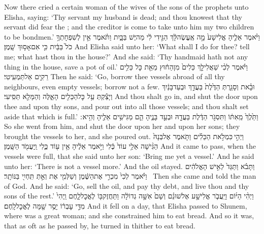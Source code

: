 {Now there cried a certain woman of the wives of the sons of the prophets unto Elisha, saying: ‘Thy servant my husband is dead; and thou knowest that thy servant did fear the \lord; and the creditor is come to take unto him my two children to be bondmen.’}
{וַיֹּ֨אמֶר אֵלֶ֤יהָ אֱלִישָׁע֙ מָ֣ה אֶֽעֱשֶׂה\maqqaf לָּ֔ךְ הַגִּ֣ידִי לִ֔י מַה\maqqaf יֶּשׁ\maqqaf {} בַּבָּ֑יִת וַתֹּ֗אמֶר אֵ֣ין לְשִׁפְחָתְךָ֥ כֹל֙ בַּבַּ֔יִת כִּ֖י אִם\maqqaf אָס֥וּךְ שָֽׁמֶן׃}
{And Elisha said unto her: ‘What shall I do for thee? tell me; what hast thou in the house?’ And she said: ‘Thy handmaid hath not any thing in the house, save a pot of oil.’}
{וַיֹּ֗אמֶר לְכִ֨י שַׁאֲלִי\maqqaf לָ֤ךְ כֵּלִים֙ מִן\maqqaf הַח֔וּץ מֵאֵ֖ת כׇּל\maqqaf {} כֵּלִ֥ים רֵקִ֖ים אַל\maqqaf תַּמְעִֽיטִי׃}
{Then he said: ‘Go, borrow thee vessels abroad of all thy neighbours, even empty vessels; borrow not a few.}
{וּבָ֗את וְסָגַ֤רְתְּ הַדֶּ֙לֶת֙ בַּעֲדֵ֣ךְ וּבְעַד\maqqaf בָּנַ֔יִךְ וְיָצַ֕קְתְּ עַ֥ל כׇּל\maqqaf הַכֵּלִ֖ים הָאֵ֑לֶּה וְהַמָּלֵ֖א תַּסִּֽיעִי׃}
{And thou shalt go in, and shut the door upon thee and upon thy sons, and pour out into all those vessels; and thou shalt set aside that which is full.’}
{וַתֵּ֙לֶךְ֙ מֵֽאִתּ֔וֹ וַתִּסְגֹּ֣ר הַדֶּ֔לֶת בַּעֲדָ֖הּ וּבְעַ֣ד בָּנֶ֑יהָ הֵ֛ם מַגִּישִׁ֥ים אֵלֶ֖יהָ וְהִ֥יא ׃}
{So she went from him, and shut the door upon her and upon her sons; they brought the vessels to her, and she poured out.}
{וַיְהִ֣י \legarmeh  כִּמְלֹ֣את הַכֵּלִ֗ים וַתֹּ֤אמֶר אֶל\maqqaf בְּנָהּ֙ הַגִּ֨ישָׁה אֵלַ֥י עוֹד֙ כֶּ֔לִי וַיֹּ֣אמֶר אֵלֶ֔יהָ אֵ֥ין ע֖וֹד כֶּ֑לִי וַֽיַּעֲמֹ֖ד הַשָּֽׁמֶן׃}
{And it came to pass, when the vessels were full, that she said unto her son: ‘Bring me yet a vessel.’ And he said unto her: ‘There is not a vessel more.’ And the oil stayed.}
{וַתָּבֹ֗א וַתַּגֵּד֙ לְאִ֣ישׁ הָאֱלֹהִ֔ים וַיֹּ֗אמֶר לְכִי֙ מִכְרִ֣י אֶת\maqqaf הַשֶּׁ֔מֶן וְשַׁלְּמִ֖י אֶת\maqqaf {} וְאַ֣תְּ  תִּֽחְיִ֖י בַּנּוֹתָֽר׃ \petucha }
{Then she came and told the man of God. And he said: ‘Go, sell the oil, and pay thy debt, and live thou and thy sons of the rest.’}
{וַיְהִ֨י הַיּ֜וֹם וַיַּֽעֲבֹ֧ר אֱלִישָׁ֣ע אֶל\maqqaf שׁוּנֵ֗ם וְשָׁם֙ אִשָּׁ֣ה גְדוֹלָ֔ה וַתַּחֲזֶק\maqqaf בּ֖וֹ לֶאֱכׇל\maqqaf לָ֑חֶם וַֽיְהִי֙ מִדֵּ֣י עׇבְר֔וֹ יָסֻ֥ר שָׁ֖מָּה לֶאֱכׇל\maqqaf לָֽחֶם׃}
{And it fell on a day, that Elisha passed to Shunem, where was a great woman; and she constrained him to eat bread. And so it was, that as oft as he passed by, he turned in thither to eat bread.}
